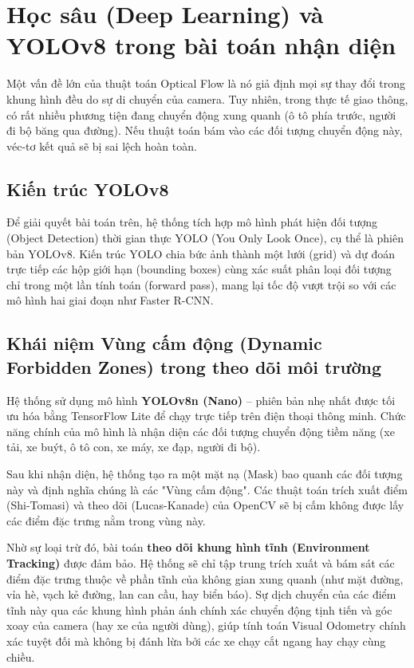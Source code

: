 \documentclass[../DoAn.tex]{subfiles}
\begin{document}
\section{Học sâu (Deep Learning) và YOLOv8 trong bài toán nhận diện}
\label{section:2.3}

Một vấn đề lớn của thuật toán Optical Flow là nó giả định mọi sự thay đổi trong khung hình đều do sự di chuyển của camera. Tuy nhiên, trong thực tế giao thông, có rất nhiều phương tiện đang chuyển động xung quanh (ô tô phía trước, người đi bộ băng qua đường). Nếu thuật toán bám vào các đối tượng chuyển động này, véc-tơ kết quả sẽ bị sai lệch hoàn toàn.

\subsection{Kiến trúc YOLOv8}
Để giải quyết bài toán trên, hệ thống tích hợp mô hình phát hiện đối tượng (Object Detection) thời gian thực YOLO (You Only Look Once), cụ thể là phiên bản YOLOv8. Kiến trúc YOLO chia bức ảnh thành một lưới (grid) và dự đoán trực tiếp các hộp giới hạn (bounding boxes) cùng xác suất phân loại đối tượng chỉ trong một lần tính toán (forward pass), mang lại tốc độ vượt trội so với các mô hình hai giai đoạn như Faster R-CNN.

\subsection{Khái niệm Vùng cấm động (Dynamic Forbidden Zones) trong theo dõi môi trường}
Hệ thống sử dụng mô hình \textbf{YOLOv8n (Nano)} – phiên bản nhẹ nhất được tối ưu hóa bằng TensorFlow Lite để chạy trực tiếp trên điện thoại thông minh. Chức năng chính của mô hình là nhận diện các đối tượng chuyển động tiềm năng (xe tải, xe buýt, ô tô con, xe máy, xe đạp, người đi bộ). 

Sau khi nhận diện, hệ thống tạo ra một mặt nạ (Mask) bao quanh các đối tượng này và định nghĩa chúng là các "Vùng cấm động". Các thuật toán trích xuất điểm (Shi-Tomasi) và theo dõi (Lucas-Kanade) của OpenCV sẽ bị cấm không được lấy các điểm đặc trưng nằm trong vùng này. 

Nhờ sự loại trừ đó, bài toán \textbf{theo dõi khung hình tĩnh (Environment Tracking)} được đảm bảo. Hệ thống sẽ chỉ tập trung trích xuất và bám sát các điểm đặc trưng thuộc về phần tĩnh của không gian xung quanh (như mặt đường, vỉa hè, vạch kẻ đường, lan can cầu, hay biển báo). Sự dịch chuyển của các điểm tĩnh này qua các khung hình phản ánh chính xác chuyển động tịnh tiến và góc xoay của camera (hay xe của người dùng), giúp tính toán Visual Odometry chính xác tuyệt đối mà không bị đánh lừa bởi các xe chạy cắt ngang hay chạy cùng chiều.
\end{document}
